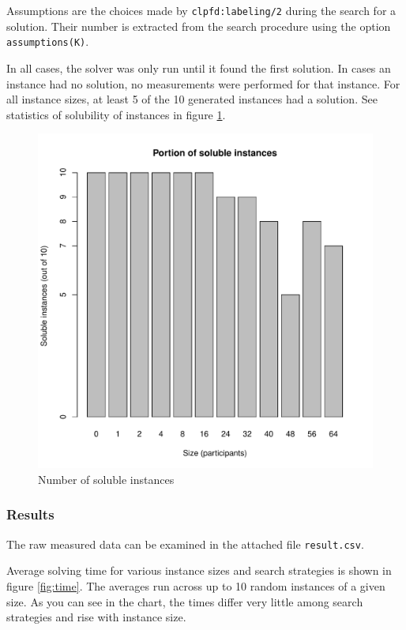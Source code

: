 \documentclass{article}
\newcommand{\file}[1]{\texttt{#1}}
\newcommand{\code}[1]{\texttt{#1}}
\begin{document}
Assumptions are the choices made by \code{clpfd:labeling/2} during the search for
a solution.
Their number is extracted from the search procedure using the option
\code{assumptions(K)}.

In all cases, the solver was only run until it found the first solution.
In cases an instance had no solution,
no measurements were performed for that instance.
For all instance sizes, at least 5 of the 10 generated instances had a solution.
See statistics of solubility of instances in figure \ref{fig:soluble}.

\begin{figure}
\centering
\includegraphics[width=\linewidth]{soluble}
\caption{Number of soluble instances}
\label{fig:soluble}
\end{figure}

\subsubsection{Results}
The raw measured data can be examined in the attached file \file{result.csv}.

Average solving time for various instance sizes and search strategies is shown
in figure \ref{fig:time}.
The averages run across up to 10 random instances of a given size.
As you can see in the chart,
the times differ very little among search strategies
and rise with instance size.
\end{document}
